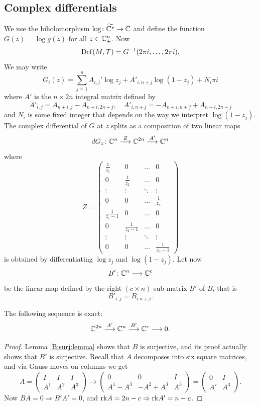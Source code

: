 \subsection{Complex differentials} \label{complex:diff:subsection}
We use the biholomorphism $\log\colon \widetilde{\mathbb{C}^*} \to \mathbb{C}$ and define the function $G(z) = \log g(z)$ for all $z\in \mathbb{C}_+^n$. Now 
$${\rm Def}(M,\mathcal{T}) = G^{-1}(2\pi i, \ldots, 2\pi i).$$ 
We may write
$$G_i(z) = \sum_{j=1}^n A_{i,j}' \log z_j + A'_{i,n+j}\log(1-z_j) + N_i\pi i$$
where $A'$ is the $n \times 2n$ integral matrix defined by
$$A'_{i,j} = A_{n+i,j} - A_{n+i,2n+j}, \quad A'_{i,n+j} = -A_{n+i,n+j} + A_{n+i,2n+j}$$ 
and $N_i$ is some fixed integer that depends on the way we interpret $\log(1-z_j)$. 
The complex differential of $G$ at $z$ splits as a composition of two linear maps
$$ dG_{ z}\colon \mathbb{C}^{n} \stackrel{Z}{\longrightarrow} \mathbb{C}^{2n} \stackrel{A'}{\longrightarrow} \mathbb{C}^n$$
where
$$Z = \begin{pmatrix}
\frac 1{z_1} & 0 & \ldots & 0 \\
0 & \frac 1{z_2} & \ldots & 0 \\
\vdots & \vdots & \ddots & \vdots\\
0 & 0 & \ldots & \frac 1{z_n} \\
\frac {1}{z_1-1} & 0 & \ldots & 0 \\
0 & \frac {1}{z_2-1} & \ldots & 0 \\
\vdots & \vdots & \ddots & \vdots\\
0 & 0 & \ldots & \frac {1}{z_n-1} 
\end{pmatrix}
$$
is obtained by differentiating $\log z_j$ and $\log (1-z_j)$.
Let now
$$B'\colon \mathbb{C}^n \longrightarrow \mathbb{C}^c$$
be the linear map defined by the right $(c\times n)$-sub-matrix $B'$ of $B$, that is $$B'_{i,j} = B_{i.n+j}.$$

\begin{prop} \label{AB2:exact:prop}
The following sequence is exact:
$$ \mathbb{C}^{2n} \stackrel{A'}{\longrightarrow} \mathbb{C}^{n} \stackrel{B'}{\longrightarrow} \mathbb{C}^c \longrightarrow 0.$$
\end{prop}
\begin{proof}
Lemma \ref{B:surj:lemma} shows that $B$ is surjective, and its proof actually shows that $B'$ is surjective. Recall that $A$ decomposes into six square matrices, and via Gauss moves on columns we get 
\begin{equation} \label{GaussA:eqn}
A=\begin{pmatrix}
I & I & I \\
A^1 & A^2 & A^3 
\end{pmatrix}
\longrightarrow
\begin{pmatrix}
0 & 0 & I \\
A^1-A^3 & -A^2 + A^3 & A^3
\end{pmatrix}
=
\begin{pmatrix}
0 & I \\
A' & A^3
\end{pmatrix}.
\end{equation}
Now $BA=0 \Rightarrow B'A'=0$, and ${\rm rk} A = 2n-c \Rightarrow {\rm rk} A' = n-c$.
\end{proof}


